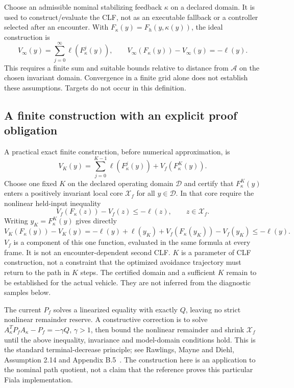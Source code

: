 \documentclass[11pt]{article}
\begin{document}
Choose an admissible nominal stabilizing feedback $\kappa$ on a declared
domain. It is used to construct/evaluate the CLF, not as an executable fallback
or a controller selected after an encounter. With $F_\kappa(y)=F_h(y,\kappa(y))$,
the ideal construction is
\[
 V_\infty(y)=\sum_{j=0}^{\infty}\ell(F_\kappa^j(y)),\qquad
 V_\infty(F_\kappa(y))-V_\infty(y)=-\ell(y).
\]
This requires a finite sum and suitable bounds relative to distance from
$\mathcal A$ on the chosen invariant domain. Convergence in a finite grid alone
does not establish these assumptions. Targets do not occur in this definition.

\subsection{A finite construction with an explicit proof obligation}
A practical exact finite construction, before numerical approximation, is
\[
 V_K(y)=\sum_{j=0}^{K-1}\ell(F_\kappa^j(y))+V_f(F_\kappa^K(y)).
\]
Choose one fixed $K$ on the declared operating domain $\mathcal D$ and certify
that $F_\kappa^K(y)$ enters a positively invariant local core $\mathcal X_f$ for
all $y\in\mathcal D$. In that core require the nonlinear held-input inequality
\[
 V_f(F_\kappa(z))-V_f(z)\le-\ell(z),\qquad z\in\mathcal X_f.
\]
Writing $y_K=F_\kappa^K(y)$ gives directly
\[
 V_K(F_\kappa(y))-V_K(y)
 =-\ell(y)+\ell(y_K)+V_f(F_\kappa(y_K))-V_f(y_K)
 \le-\ell(y).
\]
$V_f$ is a component of this one function, evaluated in the same formula at
every frame. It is not an encounter-dependent second CLF. $K$ is a parameter
of CLF construction, not a constraint that the optimized avoidance trajectory
must return to the path in $K$ steps. The certified domain and a sufficient $K$
remain to be established for the actual vehicle. They are not inferred from
the diagnostic samples below.

The current $P_f$ solves a linearized equality with exactly $Q$, leaving no
strict nonlinear remainder reserve. A constructive correction is to solve
$A_\kappa^TP_fA_\kappa-P_f=-\gamma Q$, $\gamma>1$, then bound the nonlinear
remainder and shrink $\mathcal X_f$ until the above inequality, invariance and
model-domain conditions hold. This is the standard terminal-decrease principle;
see Rawlings, Mayne and Diehl, Assumption 2.14 and Appendix B.5~\cite{mpc}.
The construction here is an application to the nominal path quotient, not a
claim that the reference proves this particular Fiala implementation.
\end{document}
